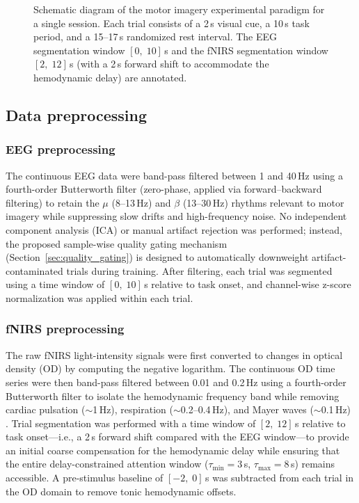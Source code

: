 \documentclass[preprint,12pt,authoryear]{elsarticle}
\begin{document}
\begin{figure}[t]
\centering
\caption{Schematic diagram of the motor imagery experimental paradigm for a single session. Each trial consists of a 2\,s visual cue, a 10\,s task period, and a 15--17\,s randomized rest interval. The EEG segmentation window $[0,\;10]$\,s and the fNIRS segmentation window $[2,\;12]$\,s (with a 2\,s forward shift to accommodate the hemodynamic delay) are annotated.}
\label{fig:paradigm}
\end{figure}

\subsection{Data preprocessing}
\label{sec:preprocessing}

\subsubsection{EEG preprocessing}
The continuous EEG data were band-pass filtered between 1 and 40\,Hz using a fourth-order Butterworth filter (zero-phase, applied via forward--backward filtering) to retain the $\mu$ (8--13\,Hz) and $\beta$ (13--30\,Hz) rhythms relevant to motor imagery while suppressing slow drifts and high-frequency noise. No independent component analysis (ICA) or manual artifact rejection was performed; instead, the proposed sample-wise quality gating mechanism (Section~\ref{sec:quality_gating}) is designed to automatically downweight artifact-contaminated trials during training. After filtering, each trial was segmented using a time window of $[0,\;10]$\,s relative to task onset, and channel-wise z-score normalization was applied within each trial.

\subsubsection{fNIRS preprocessing}
The raw fNIRS light-intensity signals were first converted to changes in optical density (OD) by computing the negative logarithm. The continuous OD time series were then band-pass filtered between 0.01 and 0.2\,Hz using a fourth-order Butterworth filter to isolate the hemodynamic frequency band while removing cardiac pulsation ($\sim$1\,Hz), respiration ($\sim$0.2--0.4\,Hz), and Mayer waves ($\sim$0.1\,Hz) \citep{scholkmann2014general}. Trial segmentation was performed with a time window of $[2,\;12]$\,s relative to task onset---i.e., a 2\,s forward shift compared with the EEG window---to provide an initial coarse compensation for the hemodynamic delay while ensuring that the entire delay-constrained attention window ($\tau_{\min}=3$\,s, $\tau_{\max}=8$\,s) remains accessible. A pre-stimulus baseline of $[-2,\;0]$\,s was subtracted from each trial in the OD domain to remove tonic hemodynamic offsets.
\end{document}

